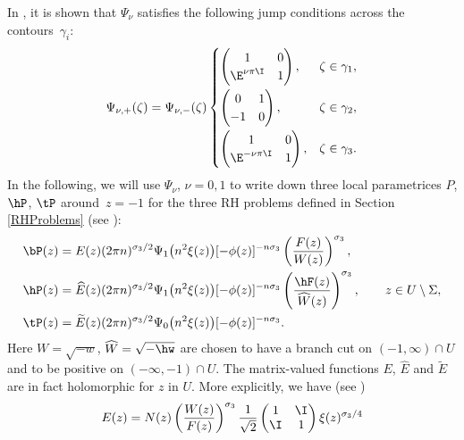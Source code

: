 In \cite[Section~6]{KMVV}, it is shown that $\Psi_\nu$ satisfies the following jump conditions across the contours~$\gamma_i$:
\begin{align*}
 \Psi_{\nu,+}(\zeta) = \Psi_{\nu,-}(\zeta)
 \begin{cases}
 \begin{pmatrix}
 1 & 0
 \\
 \E^{\nu\pi\I} & 1
 \end{pmatrix}, &\zeta \in \gamma_1,\vspace{1mm}
 \\
 \begin{pmatrix}
 0 & 1
 \\
 -1 & 0
 \end{pmatrix}, &\zeta \in \gamma_2,\vspace{1mm}
 \\
 \begin{pmatrix}
 1 & 0
 \\
 \E^{-\nu\pi\I} & 1
 \end{pmatrix}, &\zeta \in \gamma_3.
 \end{cases}
\end{align*}
In the following, we will use $\Psi_\nu$, $\nu = 0,1$ to write down three local parametrices $P$, $\hP$, $\tP$ around~$z = -1$ for the three RH problems defined in Section \ref{RHProblems} (see \cite[equation~(6.52)]{KMVV}):
\begin{align*}%
& \bP(z)= E(z)(2\pi n)^{\sigma_3/2} \Psi_1\big(n^2 \xi(z)\big) [-\phi(z)]^{-n\sigma_3}\left(\frac{F(z)}{W(z)}\right)^{\sigma_3},
 \\
& \hP(z)= \widehat E(z)(2\pi n)^{\sigma_3/2} \Psi_1\big(n^2 \xi(z)\big) [-\phi(z)]^{-n\sigma_3}\left(\frac{\hF(z)}{\widehat W(z)}\right)^{\sigma_3}, \qquad z \in U \setminus \Sigma,
 \\
& \tP(z)= \widetilde E(z)(2\pi n)^{\sigma_3/2} \Psi_0\big(n^2 \xi(z)\big) [-\phi(z)]^{-n\sigma_3}.
\end{align*}
Here $W = \sqrt{-w}$, $\widehat W = \sqrt{-\hw}$ are chosen to have a branch cut on $(-1,\infty)\cap U$ and to be positive on $(-\infty, -1)\cap U$. The matrix-valued functions $E$, $\widehat E$ and $\widetilde E$ are in fact holomorphic for $z$ in $U$. More explicitly, we have (see \cite[equation~(6.53)]{KMVV})
\begin{align}\label{formulaE}
 E(z) = N(z)\left(\frac{W(z)}{F(z)}\right)^{\sigma_3}\frac{1}{\sqrt{2}}
 \begin{pmatrix}
 1 & \I
 \\
 \I & 1
 \end{pmatrix}\xi(z)^{\sigma_3/4}
\end{align}
